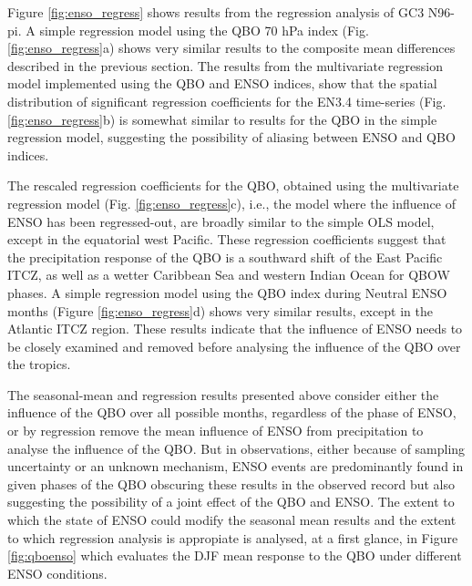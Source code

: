 Figure \ref{fig:enso_regress} shows results from the regression analysis of GC3 N96-pi. 
A simple regression model using the QBO 70 hPa index (Fig. \ref{fig:enso_regress}a) shows very similar results to the composite mean differences described in the previous section.
The results from the multivariate regression model implemented using the QBO and ENSO indices, show that the spatial distribution of significant regression coefficients for the EN3.4 time-series (Fig. \ref{fig:enso_regress}b) is somewhat similar to results for the QBO in the simple regression model, suggesting the possibility of aliasing between ENSO and QBO indices. 

 The rescaled regression coefficients for the QBO, obtained using the multivariate regression model (Fig. \ref{fig:enso_regress}c), i.e., the model where the influence of ENSO has been regressed-out, are broadly similar to the simple OLS model, except in the equatorial west Pacific. These regression coefficients suggest that the precipitation response of the QBO is a southward shift of the East Pacific ITCZ, as well as a wetter Caribbean Sea and western Indian Ocean for QBOW phases.
 A simple regression model using the QBO index during Neutral ENSO months (Figure \ref{fig:enso_regress}d) shows very similar results, except in the Atlantic ITCZ region. 
 These results indicate that the influence of ENSO needs to be closely examined and removed before analysing the influence of the QBO over the tropics. 

The seasonal-mean and regression results presented above consider either the influence of the QBO over all possible months, regardless of the phase of ENSO, or by regression remove the mean influence of ENSO from precipitation to analyse the influence of the QBO. But in observations, either because of sampling uncertainty or an unknown mechanism, ENSO events are predominantly found in given phases of the QBO obscuring these results in the observed record but also suggesting the possibility of a joint effect of the QBO and ENSO. The extent to which the state of ENSO could modify the seasonal mean results and the extent to which regression analysis is appropiate is analysed, at a first glance, in Figure \ref{fig:qboenso} which evaluates the DJF mean response to the QBO under different ENSO conditions.

